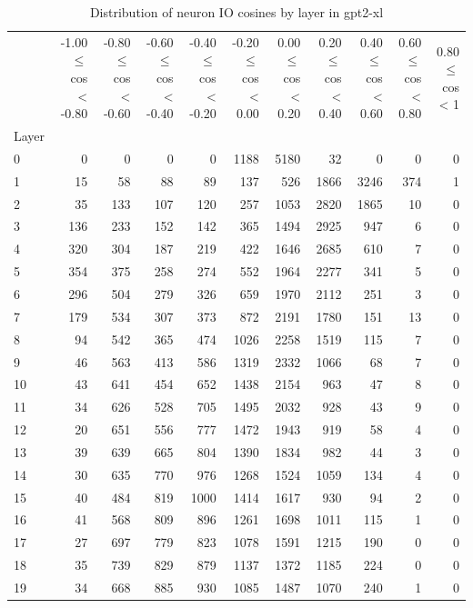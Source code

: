 \begin{table}
\caption{Distribution of neuron IO cosines by layer in gpt2-xl}
\label{tab:gpt2-xl_half_coarse}
\begin{tabular}{lrrrrrrrrrr}
 & -1.00 $\leq$ cos < -0.80 & -0.80 $\leq$ cos < -0.60 & -0.60 $\leq$ cos < -0.40 & -0.40 $\leq$ cos < -0.20 & -0.20 $\leq$ cos < 0.00 & 0.00 $\leq$ cos < 0.20 & 0.20 $\leq$ cos < 0.40 & 0.40 $\leq$ cos < 0.60 & 0.60 $\leq$ cos < 0.80 & 0.80 $\leq$ cos < 1 \\
Layer &  &  &  &  &  &  &  &  &  &  \\
0 & 0 & 0 & 0 & 0 & 1188 & 5180 & 32 & 0 & 0 & 0 \\
1 & 15 & 58 & 88 & 89 & 137 & 526 & 1866 & 3246 & 374 & 1 \\
2 & 35 & 133 & 107 & 120 & 257 & 1053 & 2820 & 1865 & 10 & 0 \\
3 & 136 & 233 & 152 & 142 & 365 & 1494 & 2925 & 947 & 6 & 0 \\
4 & 320 & 304 & 187 & 219 & 422 & 1646 & 2685 & 610 & 7 & 0 \\
5 & 354 & 375 & 258 & 274 & 552 & 1964 & 2277 & 341 & 5 & 0 \\
6 & 296 & 504 & 279 & 326 & 659 & 1970 & 2112 & 251 & 3 & 0 \\
7 & 179 & 534 & 307 & 373 & 872 & 2191 & 1780 & 151 & 13 & 0 \\
8 & 94 & 542 & 365 & 474 & 1026 & 2258 & 1519 & 115 & 7 & 0 \\
9 & 46 & 563 & 413 & 586 & 1319 & 2332 & 1066 & 68 & 7 & 0 \\
10 & 43 & 641 & 454 & 652 & 1438 & 2154 & 963 & 47 & 8 & 0 \\
11 & 34 & 626 & 528 & 705 & 1495 & 2032 & 928 & 43 & 9 & 0 \\
12 & 20 & 651 & 556 & 777 & 1472 & 1943 & 919 & 58 & 4 & 0 \\
13 & 39 & 639 & 665 & 804 & 1390 & 1834 & 982 & 44 & 3 & 0 \\
14 & 30 & 635 & 770 & 976 & 1268 & 1524 & 1059 & 134 & 4 & 0 \\
15 & 40 & 484 & 819 & 1000 & 1414 & 1617 & 930 & 94 & 2 & 0 \\
16 & 41 & 568 & 809 & 896 & 1261 & 1698 & 1011 & 115 & 1 & 0 \\
17 & 27 & 697 & 779 & 823 & 1078 & 1591 & 1215 & 190 & 0 & 0 \\
18 & 35 & 739 & 829 & 879 & 1137 & 1372 & 1185 & 224 & 0 & 0 \\
19 & 34 & 668 & 885 & 930 & 1085 & 1487 & 1070 & 240 & 1 & 0 \\

\end{tabular}
\end{table}
